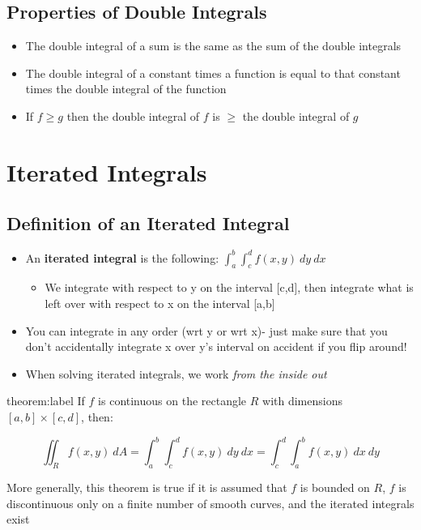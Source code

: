 \documentclass{package/notes}
\begin{document}
\subsection{Properties of Double Integrals}

\begin{itemize}
	\item The double integral of a sum is the same as the sum of the double integrals
	\item The double integral of a constant times a function is equal to that constant times the double integral of the function
	\item If $f \ge g$ then the double integral of $f$ is $\ge$ the double integral of $g$
\end{itemize}




\section{Iterated Integrals}


\subsection{Definition of an Iterated Integral}

\begin{itemize}
	\item An \textbf{iterated integral} is the following: $\int_{a}^{b}\int_c^df(x,y)\:dy\:dx$
	\begin{itemize}
		\item We integrate with respect to y on the interval [c,d], then integrate what is left over with respect to x on the interval [a,b]
	\end{itemize}
	\item You can integrate in any order (wrt y or wrt x)- just make sure that you don't accidentally integrate x over y's interval on accident if you flip around!
	\item When solving iterated integrals, we work \textit{from the inside out}
\end{itemize}

\begin{theorem}{theorem:label}
	If $f$ is continuous on the rectangle $R$ with dimensions $[a,b]\times[c,d]$, then:

	$$\iint_Rf(x,y)\:dA=\int_a^b\int_c^df(x,y)\:dy\:dx=\int_c^d\int_a^bf(x,y)\:dx\:dy$$

	More generally, this theorem is true if it is assumed that $f$ is bounded on $R$, $f$ is discontinuous only on a finite number of smooth curves, and the iterated integrals exist
\end{theorem}
\end{document}
